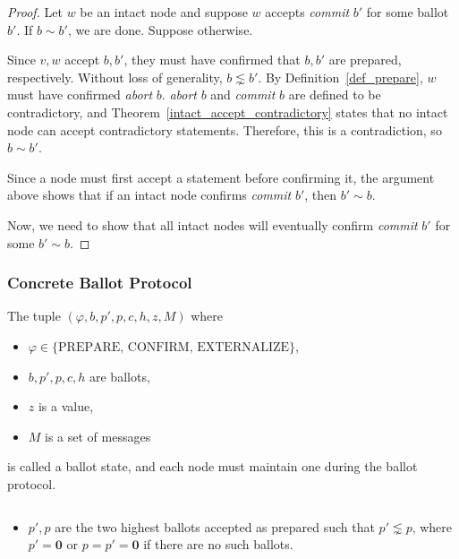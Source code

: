 \begin{proof}
    Let $w$ be an intact node and suppose $w$ accepts \textit{commit} $b'$ for some ballot $b'$.
    If $b \sim b'$, we are done.
    Suppose otherwise.

    Since $v, w$ accept $b, b'$, they must have confirmed that $b, b'$ are prepared, respectively.
    Without loss of generality, $b \lnsim b'$.
    By Definition~\ref{def_prepare}, $w$ must have confirmed \textit{abort} $b$.
    \textit{abort} $b$ and \textit{commit} $b$ are defined to be contradictory, and Theorem~\ref{intact_accept_contradictory} states that no intact node can accept contradictory statements.
    Therefore, this is a contradiction, so $b \sim b'$.

    Since a node must first accept a statement before confirming it, the argument above shows that if an intact node confirms \textit{commit} $b'$, then $b' \sim b$.
    
    Now, we need to show that all intact nodes will eventually confirm \textit{commit} $b'$ for some $b' \sim b$.
\end{proof}

\subsubsection{Concrete Ballot Protocol}

\begin{defn}
    The tuple $(\varphi, b, p', p, c, h, z, M)$ where
    \begin{itemize}
        \item
            $\varphi \in \{\text{PREPARE, CONFIRM, EXTERNALIZE}\}$,
        \item
            $b, p', p, c, h$ are ballots,
        \item
            $z$ is a value,
        \item
            $M$ is a set of messages
    \end{itemize}
    is called a ballot state, and each node must maintain one during the ballot protocol.
\end{defn}

\begin{defn}
    $ $
    \begin{itemize}
        \item
            $p', p$ are the two highest ballots accepted as prepared such that $p' \lnsim p$, where $p' = \textbf{0}$ or $p = p' = \textbf{0}$ if there are no such ballots.
    \end{itemize}
\end{defn}

